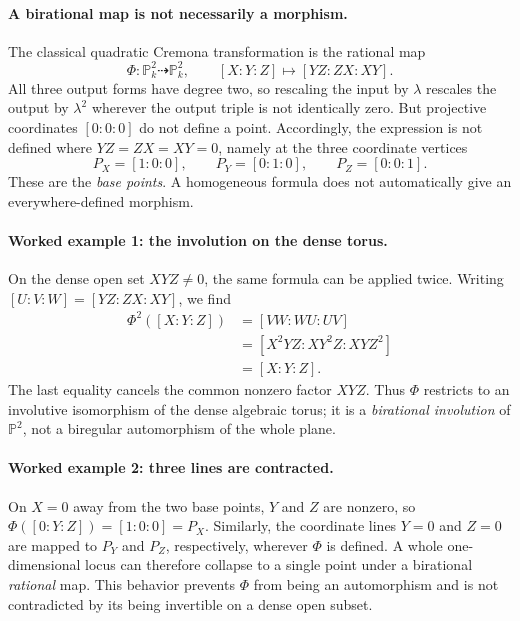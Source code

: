 \paragraph{A birational map is not necessarily a morphism.}
The classical quadratic Cremona transformation is the rational
map
\[
 \Phi:\mathbb P^2_k\dashrightarrow\mathbb P^2_k,
 \qquad [X:Y:Z]\longmapsto[YZ:ZX:XY].
\]
All three output forms have degree two, so rescaling the input
by $\lambda$ rescales the output by $\lambda^2$ wherever the
output triple is not identically zero.  But projective coordinates
$[0:0:0]$ do not define a point.  Accordingly, the expression is
not defined where $YZ=ZX=XY=0$, namely at the three coordinate
vertices
\[
 P_X=[1:0:0],\qquad P_Y=[0:1:0],\qquad P_Z=[0:0:1].
\]
These are the \emph{base points}.  A homogeneous formula does
not automatically give an everywhere-defined morphism.

\paragraph{Worked example 1: the involution on the dense torus.}
On the dense open set $XYZ\ne0$, the same formula can be
applied twice.  Writing $[U:V:W]=[YZ:ZX:XY]$, we find
\[
 \begin{aligned}
 \Phi^2([X:Y:Z])
   &=[VW:WU:UV]\\
   &=[X^2YZ:XY^2Z:XYZ^2]\\
   &=[X:Y:Z].
 \end{aligned}
\]
The last equality cancels the common nonzero factor $XYZ$.
Thus $\Phi$ restricts to an involutive isomorphism of the
dense algebraic torus; it is a \emph{birational involution} of
$\mathbb P^2$, not a biregular automorphism of the whole plane.

\paragraph{Worked example 2: three lines are contracted.}
On $X=0$ away from the two base points, $Y$ and $Z$ are
nonzero, so $\Phi([0:Y:Z])=[1:0:0]=P_X$.
Similarly, the coordinate lines $Y=0$ and $Z=0$ are mapped
to $P_Y$ and $P_Z$, respectively, wherever $\Phi$ is defined.
A whole one-dimensional locus can therefore collapse to a
single point under a birational \emph{rational} map.  This
behavior prevents $\Phi$ from being an automorphism and is
not contradicted by its being invertible on a dense open subset.

